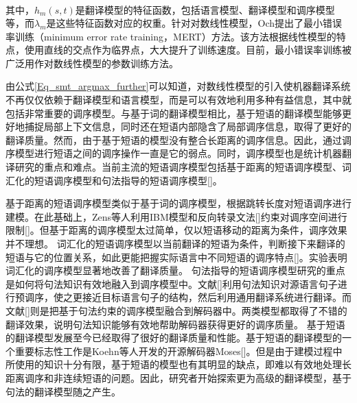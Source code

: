 \begin{equation}
\label{Eq_smt_argmax_further}
\begin{split}
\end{split}
\end{equation}

其中，$h_m(s,t)$是翻译模型的特征函数，包括语言模型、翻译模型和调序模型等，而$\lambda_m$是这些特征函数对应的权重。针对对数线性模型，Och提出了最小错误率训练（minimum error rate training，MERT）方法。该方法根据线性模型的特点，使用直线的交点作为临界点，大大提升了训练速度。目前，最小错误率训练被广泛用作对数线性模型的参数训练方法。

由公式\ref{Eq_smt_argmax_further}可以知道，对数线性模型的引入使机器翻译系统不再仅仅依赖于翻译模型和语言模型，而是可以有效地利用多种有益信息，其中就包括非常重要的调序模型。与基于词的翻译模型相比，基于短语的翻译模型能够更好地捕捉局部上下文信息，同时还在短语内部隐含了局部调序信息，取得了更好的翻译质量。然而，由于基于短语的模型没有整合长距离的调序信息。因此，通过调序模型进行短语之间的调序操作一直是它的弱点。同时，调序模型也是统计机器翻译研究的重点和难点。当前主流的短语调序模型包括基于距离的短语调序模型、词汇化的短语调序模型和句法指导的短语调序模型[\cite{zhangjiajun:2011}]。

基于距离的短语调序模型类似于基于词的调序模型，根据跳转长度对短语调序进行建模。在此基础上，Zens等人利用IBM模型和反向转录文法[\cite{Wu:1997}]约束对调序空间进行限制[\cite{Zens:2003}]。但基于距离的调序模型太过简单，仅以短语移动的距离为条件，调序效果并不理想。
词汇化的短语调序模型以当前翻译的短语为条件，判断接下来翻译的短语与它的位置关系，如此更能把握实际语言中不同短语的调序特点[\cite{Tillmann:2004,Kumar:2005}]。实验表明词汇化的调序模型显著地改善了翻译质量。
句法指导的短语调序模型研究的重点是如何将句法知识有效地融入到调序模型中。文献[\cite{Collins:2005,Wang:2007,LiChiho:2007}]利用句法知识对源语言句子进行预调序，使之更接近目标语言句子的结构，然后利用通用翻译系统进行翻译。而文献[\cite{Zhang:2007,Xiong:2008,Zhang:2009,Zhang:2013}]则是把基于句法约束的调序模型融合到解码器中。两类模型都取得了不错的翻译效果，说明句法知识能够有效地帮助解码器获得更好的调序质量。
基于短语的翻译模型发展至今已经取得了很好的翻译质量和性能。基于短语的翻译模型的一个重要标志性工作是Koehn等人开发的开源解码器Moses[\cite{Koehn:2007}]。但是由于建模过程中所使用的知识十分有限，基于短语的模型也有其明显的缺点，即难以有效地处理长距离调序和非连续短语的问题。因此，研究者开始探索更为高级的翻译模型，基于句法的翻译模型随之产生。

